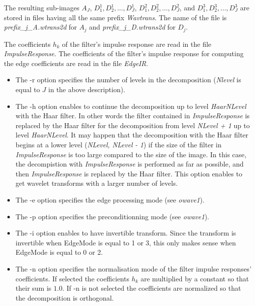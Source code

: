 The resulting sub-images $A_{J}$, $D^{1}_{1}, D^{1}_{2}, \ldots, D^{1}_{J}$, 
$D^{2}_{1}, D^{2}_{2}, \ldots, D^{2}_{J}$, and 
$D^{3}_{1}, D^{3}_{2}, \ldots, D^{3}_{J}$ are stored in files having 
all the same prefix {\em Wavtrans}. The name of the file is 
{\em prefix\_j\_A.wtrans2d} for \( A_{j} \) and {\em prefix\_j\_D.wtrans2d} 
for \( D_{j} \).

The coefficients \( h_{k} \) of the filter's impulse response are read 
in the file {\em ImpulseResponse}. The coefficients of the filter's impulse 
response for computing the edge coefficients are read 
in the file {\em EdgeIR}. 


\begin{itemize}
\item
The -r option specifies the number of levels in the decomposition 
({\em Nlevel} is equal to $J$ in the above description).
\item
The -h option enables to continue the decomposition up to level 
{\em HaarNLevel} with the Haar filter. In other words the filter 
contained in {\em ImpulseResponse} is replaced by the Haar filter 
for the decomposition from level {\em NLevel + 1} up to level 
{\em HaarNLevel}. It may happen that the decomposition with the 
Haar filter begins at a lower level ({\em NLevel, NLevel - 1}) 
if the size of the filter in {\em ImpulseResponse} is too large 
compared to the size of the image. In this case, the decompistion 
with {\em ImpulseResponse} is performed as far as possible, 
and then {\em ImpulseResponse} is replaced by the Haar filter. 
This option enables to get wavelet transforms with a larger 
number of levels. 
\item
The -e option specifies the edge processing mode (see {\em owave1}).
\item
The -p option specifies the preconditionning mode (see {\em owave1}).
\item
The -i option enables to have invertible transform. Since the transform is invertible when EdgeMode is equal to 1 or 3, this only makes sense when EdgeMode is equal to 0 or 2. 
\item
The -n option specifies the normalisation mode of the filter impulse responses' coefficients. If selected the coefficients $h_{k}$ are multiplied by a constant so that their sum is $1.0$. If -n is not selected the coefficients are normalized so that the decomposition is orthogonal. 
\end{itemize}


